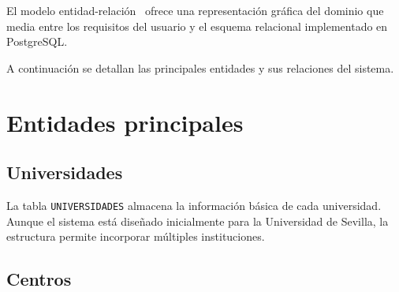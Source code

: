 El modelo entidad-relación~\cite{chen1976entityrelationship} ofrece una representación gráfica del dominio que media entre los requisitos del usuario y el esquema relacional implementado en PostgreSQL.

A continuación se detallan las principales entidades y sus relaciones del sistema.


\section{Entidades principales}\label{sec:entidades}

\subsection{Universidades}

La tabla \texttt{UNIVERSIDADES} almacena la información básica de cada universidad. Aunque el sistema está diseñado inicialmente para la Universidad de Sevilla, la estructura permite incorporar múltiples instituciones.


\subsection{Centros}

